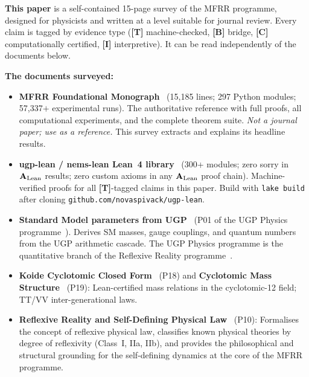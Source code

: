 \documentclass[11pt]{article}
\newcommand{\tagT}{\textbf{[T]}}
\newcommand{\tagB}{\textbf{[B]}}
\newcommand{\tagC}{\textbf{[C]}}
\newcommand{\tagI}{\textbf{[I]}}
\newcommand{\CatAL}{\ensuremath{\textbf{A}_{\rm Lean}}}
\theoremstyle{plain}
\theoremstyle{definition}
\theoremstyle{remark}
\begin{document}
\bigskip
\begin{tcolorbox}[colback=yellow!5!white,colframe=orange!60!black,
  title={\textbf{How to use this paper and the documents it surveys}},
  fonttitle=\bfseries,left=6pt,right=6pt,top=5pt,bottom=5pt,breakable]
\small
\textbf{This paper} is a self-contained 15-page survey of the MFRR programme,
designed for physicists and written at a level suitable for journal review.
Every claim is tagged by evidence type (\tagT{} machine-checked, \tagB{} bridge,
\tagC{} computationally certified, \tagI{} interpretive).
It can be read independently of the documents below.

\medskip
\textbf{The documents surveyed:}

\begin{itemize}[leftmargin=1.5em,itemsep=0.35em]
  \item \textbf{MFRR Foundational Monograph}~\cite{SpivackMFRR}
    (15{,}185 lines; 297 Python modules; 57{,}337$+$ experimental runs).
    The authoritative reference with full proofs, all computational experiments,
    and the complete theorem suite.
    \emph{Not a journal paper; use as a reference.}
    This survey extracts and explains its headline results.

  \item \textbf{ugp-lean / nems-lean Lean~4 library}~\cite{ugp-lean,SpivackUGPFormalization}
    (300+ modules; zero sorry in \CatAL{} results; zero custom axioms in any \CatAL{} proof chain).
    Machine-verified proofs for all \tagT{}-tagged claims in this paper.
    Build with \texttt{lake build} after cloning \texttt{github.com/novaspivack/ugp-lean}.

  \item \textbf{Standard Model parameters from UGP}~\cite{Spivack2026_SM_UGP}
    (P01 of the UGP Physics programme~\cite{SpivackResearchProgrammes}).
    Derives SM masses, gauge couplings, and quantum numbers from the UGP arithmetic cascade.
    The UGP Physics programme is the quantitative branch of the Reflexive Reality programme~\cite{SpivackResearchProgrammes}.

  \item \textbf{Koide Cyclotomic Closed Form}~\cite{Spivack2026_Koide} (P18)
    and \textbf{Cyclotomic Mass Structure}~\cite{Spivack2026_CyclotomicMass} (P19):
    Lean-certified mass relations in the cyclotomic-12 field;
    TT/VV inter-generational laws.

  \item \textbf{Reflexive Reality and Self-Defining Physical Law}~\cite{SpivackReflexiveLaw} (P10):
    Formalises the concept of reflexive physical law, classifies known physical theories by
    degree of reflexivity (Class~I, IIa, IIb), and provides the philosophical and structural
    grounding for the self-defining dynamics at the core of the MFRR programme.


\end{itemize}
\end{tcolorbox}
\end{document}
